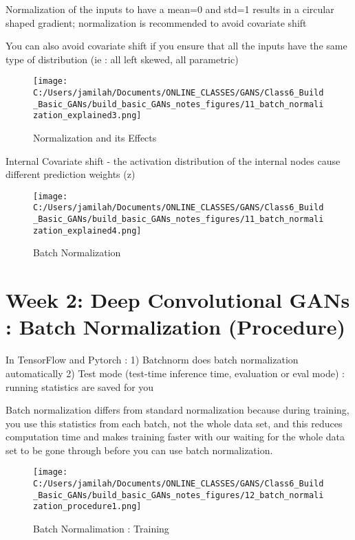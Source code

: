 \documentclass[11pt, onecolumn]{article}
\begin{document}
Normalization of the inputs to have a mean=0 and std=1 results in a circular shaped gradient; normalization is recommended to avoid covariate shift

You can also avoid covariate shift if you ensure that all the inputs have the same type of distribution (ie : all left skewed, all parametric)

\begin{figure}[htp]
\begin{center}
\texttt{[image: C:/Users/jamilah/Documents/ONLINE\_CLASSES/GANS/Class6\_Build\_Basic\_GANs/build\_basic\_GANs\_notes\_figures/11\_batch\_normalization\_explained3.png]}
\end{center}
\caption{Normalization and its Effects}
\label{11_batch_normalization_explained3}
\end{figure}

Internal Covariate shift - the activation distribution of the internal nodes cause different prediction weights (z)

\begin{figure}[htp]
\begin{center}
\texttt{[image: C:/Users/jamilah/Documents/ONLINE\_CLASSES/GANS/Class6\_Build\_Basic\_GANs/build\_basic\_GANs\_notes\_figures/11\_batch\_normalization\_explained4.png]}
\end{center}
\caption{Batch Normalization}
\label{11_batch_normalization_explained4}
\end{figure}


\clearpage
\section{Week 2: Deep Convolutional GANs : Batch Normalization (Procedure)}

In TensorFlow and Pytorch :
1) Batchnorm does batch normalization automatically
2) Test mode (test-time inference time, evaluation or eval mode) : running statistics are saved for you


Batch normalization differs from standard normalization because during training, you use this statistics from each batch, not the whole data set, and this reduces computation time and makes training faster with our waiting for the whole data set to be gone through before you can use batch normalization.  

\begin{figure}[htp]
\begin{center}
\texttt{[image: C:/Users/jamilah/Documents/ONLINE\_CLASSES/GANS/Class6\_Build\_Basic\_GANs/build\_basic\_GANs\_notes\_figures/12\_batch\_normalization\_procedure1.png]}
\end{center}
\caption{Batch Normalimation : Training}
\label{12_batch_normalization_procedure1}
\end{figure}
\end{document}
